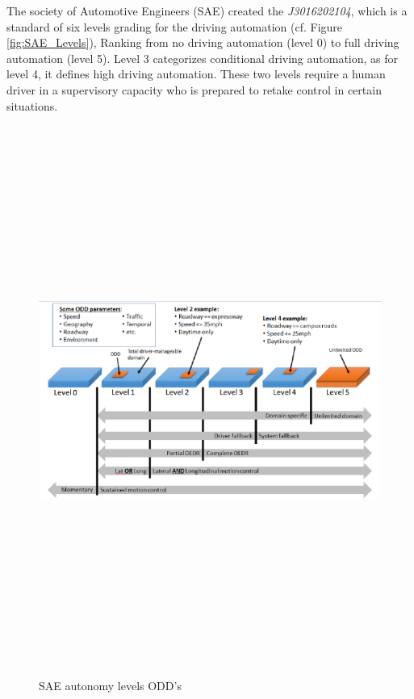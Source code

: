  
 The society of Automotive Engineers (SAE) created the \textit{J3016202104}\cite{sae2018taxonomy}, which is a standard of six levels grading for the driving automation (cf. Figure \ref{fig:SAE_Levels}), Ranking from no driving automation (level 0) to full driving automation (level 5). Level 3 categorizes conditional driving automation, as for level 4, it defines high driving automation. These two levels require a human driver in a supervisory capacity who is prepared to retake control in certain situations. 
 
 \begin{figure}[!h]
        \centering 
        \includegraphics[width=12cm,height=18cm,keepaspectratio]{chapters/Chapitre_2/Figures/SAE_ODD.png}
        \caption{SAE autonomy levels ODD's \cite{2018SURFACEVR}}
        \label{fig:SAE_ODD}
                \vspace{-5mm}
        \end{figure}


